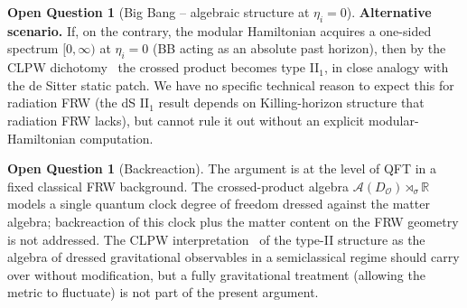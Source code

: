 \documentclass[11pt]{article}
\theoremstyle{definition}
\newtheorem{question}[theorem]{Open Question}
\newcommand{\R}{\mathbb{R}}
\renewcommand{\AA}{\mathcal{A}}
\newcommand{\OO}{\mathcal{O}}
\begin{document}
\begin{question}[Big Bang -- algebraic structure at $\eta_i=0$]
\noindent\textbf{Alternative scenario.} If, on the contrary, the modular Hamiltonian acquires a one-sided spectrum $[0,\infty)$ at $\eta_i=0$ (BB acting as an absolute past horizon), then by the CLPW dichotomy~\cite{CLPW2023} the crossed product becomes type II$_1$, in close analogy with the de Sitter static patch. We have no specific technical reason to expect this for radiation FRW (the dS II$_1$ result depends on Killing-horizon structure that radiation FRW lacks), but cannot rule it out without an explicit modular-Hamiltonian computation.
\end{question}

\begin{question}[Backreaction]
The argument is at the level of QFT in a fixed classical FRW background. The crossed-product algebra $\AA(D_\OO)\rtimes_\sigma \R$ models a single quantum clock degree of freedom dressed against the matter algebra; backreaction of this clock plus the matter content on the FRW geometry is not addressed. The CLPW interpretation~\cite{CLPW2023} of the type-II structure as the algebra of dressed gravitational observables in a semiclassical regime should carry over without modification, but a fully gravitational treatment (allowing the metric to fluctuate) is not part of the present argument.
\end{question}
\end{document}
